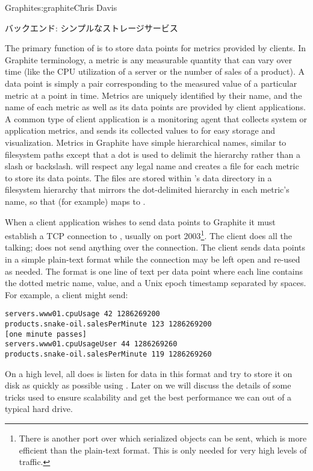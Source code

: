 \begin{aosachapter}{Graphite}{s:graphite}{Chris Davis}
\begin{aosasect1}{バックエンド: シンプルなストレージサービス}

The primary function of  is to store data points for metrics
provided by clients. In Graphite terminology, a metric is any
measurable quantity that can vary over time (like the CPU utilization
of a server or the number of sales of a product). A data point is
simply a  pair corresponding to the measured
value of a particular metric at a point in time. Metrics are uniquely
identified by their name, and the name of each metric as well as its
data points are provided by client applications. A common type of
client application is a monitoring agent that collects system or
application metrics, and sends its collected values to  for easy
storage and visualization.  Metrics in Graphite have simple
hierarchical names, similar to filesystem paths except that a dot is
used to delimit the hierarchy rather than a slash or backslash.
 will respect any legal name and creates a  file for each
metric to store its data points. The  files are stored within
's data directory in a filesystem hierarchy that mirrors the
dot-delimited hierarchy in each metric's name, so that (for example)
 maps to
.

When a client application wishes to send data points to Graphite it
must establish a TCP connection to , usually on port
2003\footnote{There is another port over which serialized objects can
be sent, which is more efficient than the plain-text format. This is
only needed for very high levels of traffic.}.  The client does all
the talking;  does not send anything over the connection. The
client sends data points in a simple plain-text format while the
connection may be left open and re-used as needed. The format is one
line of text per data point where each line contains the dotted metric
name, value, and a Unix epoch timestamp separated by spaces.  For
example, a client might send:

\begin{verbatim}
servers.www01.cpuUsage 42 1286269200
products.snake-oil.salesPerMinute 123 1286269200
[one minute passes]
servers.www01.cpuUsageUser 44 1286269260
products.snake-oil.salesPerMinute 119 1286269260
\end{verbatim}

On a high level, all  does is listen for data in this format and
try to store it on disk as quickly as possible using . Later on
we will discuss the details of some tricks used to ensure scalability
and get the best performance we can out of a typical hard drive.


\end{aosasect1}
\end{aosachapter}
